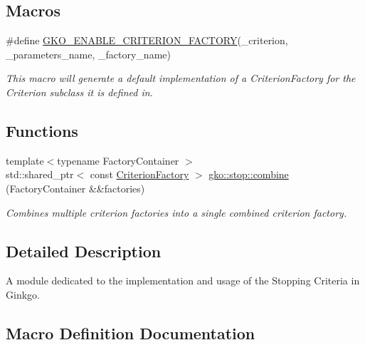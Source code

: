 \subsection*{Macros}
\begin{DoxyCompactItemize}
\item 
\#define \hyperlink{group__stop_ga5a998013602bad749e586a5664670cae}{G\+K\+O\+\_\+\+E\+N\+A\+B\+L\+E\+\_\+\+C\+R\+I\+T\+E\+R\+I\+O\+N\+\_\+\+F\+A\+C\+T\+O\+RY}(\+\_\+criterion,  \+\_\+parameters\+\_\+name,  \+\_\+factory\+\_\+name)
\begin{DoxyCompactList}\small\item\em This macro will generate a default implementation of a Criterion\+Factory for the Criterion subclass it is defined in. \end{DoxyCompactList}\end{DoxyCompactItemize}
\subsection*{Functions}
\begin{DoxyCompactItemize}
\item 
{\footnotesize template$<$typename Factory\+Container $>$ }\\std\+::shared\+\_\+ptr$<$ const \hyperlink{namespacegko_1_1stop_ab12a51109c50b35ec36dc5a393d6a9a0}{Criterion\+Factory} $>$ \hyperlink{group__stop_ga3a3325b3a7660501f3bb72d08b09f2d2}{gko\+::stop\+::combine} (Factory\+Container \&\&factories)
\begin{DoxyCompactList}\small\item\em Combines multiple criterion factories into a single combined criterion factory. \end{DoxyCompactList}\end{DoxyCompactItemize}


\subsection{Detailed Description}
A module dedicated to the implementation and usage of the Stopping Criteria in Ginkgo. 



\subsection{Macro Definition Documentation}
\mbox{\label{group__stop_ga5a998013602bad749e586a5664670cae}} 

